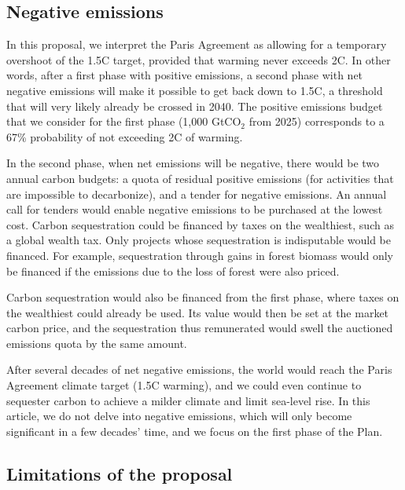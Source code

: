 \documentclass[12pt,english]{article}
\begin{document}
\subsection{Negative emissions\label{subsec:negative_emissions}}

In this proposal, we interpret the Paris Agreement as allowing for a temporary overshoot of the 1.5\textdegree{}C target, provided that warming never exceeds 2\textdegree{}C. In other words, after a first phase with positive emissions, a second phase with net negative emissions will make it possible to get back down to 1.5\textdegree{}C, a threshold that will very likely already be crossed in 2040.\citep{diffenbaugh_data-driven_2023} 
The positive emissions budget that we consider for the first phase (1,000 GtCO$_\text{2}$ from 2025) corresponds to a 67\% probability of not exceeding 2\textdegree{}C of warming. 

In the second phase, when net emissions will be negative, there would be two annual carbon budgets: a quota of residual positive emissions (for activities that are impossible to decarbonize), and a tender for negative emissions. An annual call for tenders would enable negative emissions to be purchased at the lowest cost. Carbon sequestration could be financed by taxes on the wealthiest, such as a global wealth tax. Only projects whose sequestration is indisputable would be financed. For example, sequestration through gains in forest biomass would only be financed if the emissions due to the loss of forest were also priced. 

Carbon sequestration would also be financed from the first phase, where taxes on the wealthiest could already be used. Its value would then be set at the market carbon price, and the sequestration thus remunerated would swell the auctioned emissions quota by the same amount.\citep{edenhofer_governance_2023} 

After several decades of net negative emissions, the world would reach the Paris Agreement climate target (1.5\textdegree{}C warming), and we could even continue to sequester carbon to achieve a milder climate and limit sea-level rise. In this article, we do not delve into negative emissions, which will only become significant in a few decades' time, and we focus on the first phase of the Plan. 


\subsection{Limitations of the proposal\label{subsec:limitation}}
\end{document}
